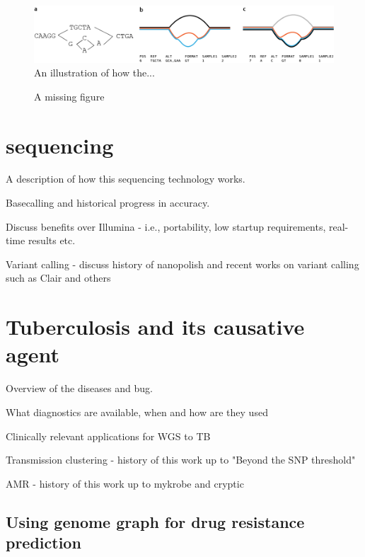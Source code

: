 \begin{figure}
\begin{center}
\includegraphics[width=0.95\columnwidth]{Chapter0/Figs/variant_representation.png}
\caption{{An illustration of how the...
{\label{fig:var-representation}}
}}
\end{center}
\end{figure}

\begin{figure}
\centering
{}
\caption{A missing figure}
\label{fig:reference-bias}
\end{figure}


\section{\ont{} sequencing}
A description of how this sequencing technology works.

Basecalling and historical progress in accuracy. %

Discuss benefits over Illumina - i.e., portability, low startup requirements, real-time results etc.

Variant calling - discuss history of nanopolish and recent works on variant calling such as Clair and others

\section{Tuberculosis and its causative agent}

Overview of the diseases and bug.

What diagnostics are available, when and how are they used

Clinically relevant applications for WGS to TB

Transmission clustering - history of this work up to "Beyond the SNP threshold"

AMR - history of this work up to mykrobe and cryptic

\subsection{Using genome graph for drug resistance prediction}
\label{sec:genome-graphs-dst}

